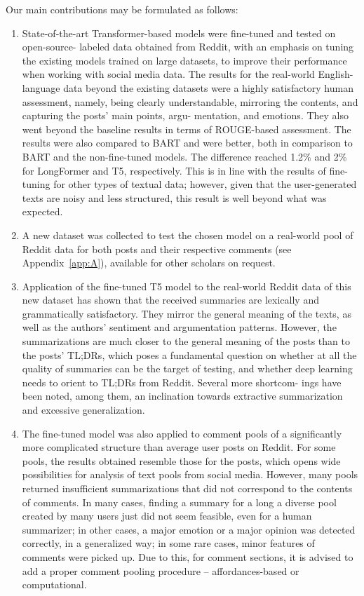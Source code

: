 Our main contributions may be formulated as follows:
\begin{enumerate}
	\item State-of-the-art Transformer-based models were fine-tuned and tested on open-source- labeled data obtained from Reddit, with an emphasis on tuning the existing models trained on large datasets, to improve their performance when working with social media data. The results for the real-world English-language data beyond the existing datasets were a highly satisfactory human assessment, namely, being clearly understandable, mirroring the contents, and capturing the posts’ main points, argu- mentation, and emotions. They also went beyond the baseline results in terms of ROUGE-based assessment. The results were also compared to BART and were better, both in comparison to BART and the non-fine-tuned models. The difference reached 1.2\% and 2\% for LongFormer and T5, respectively. This is in line with the results of fine-tuning for other types of textual data; however, given that the user-generated texts are noisy and less structured, this result is well beyond what was expected.
	
	\item A new dataset was collected to test the chosen model on a real-world pool of Reddit data for both posts and their respective comments (see Appendix~\cref{app:A}), available for other scholars on request.
	
	\item Application of the fine-tuned T5 model to the real-world Reddit data of this new dataset has shown that the received summaries are lexically and grammatically satisfactory. They mirror the general meaning of the texts, as well as the authors’ sentiment and argumentation patterns. However, the summarizations are much closer to the general meaning of the posts than to the posts’ TL;DRs, which poses a fundamental question on whether at all the quality of summaries can be the target of testing, and whether deep learning needs to orient to TL;DRs from Reddit. Several more shortcom- ings have been noted, among them, an inclination towards extractive summarization and excessive generalization.
	
	\item The fine-tuned model was also applied to comment pools of a significantly more complicated structure than average user posts on Reddit. For some pools, the results obtained resemble those for the posts, which opens wide possibilities for analysis of text pools from social media. However, many pools returned insufficient summarizations that did not correspond to the contents of comments. In many cases, finding a summary for a long a diverse pool created by many users just did not seem feasible, even for a human summarizer; in other cases, a major emotion or a major opinion was detected correctly, in a generalized way; in some rare cases, minor features of comments were picked up. Due to this, for comment sections, it is advised to add a proper comment pooling procedure -- affordances-based or computational.
	

\end{enumerate}
